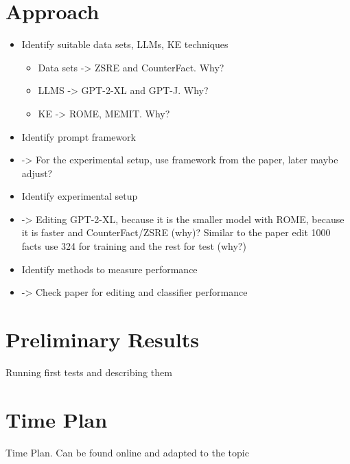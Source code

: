 \documentclass[sigplan, nonacm]{acmart}
\begin{document}
    \section{Approach}
        \begin{itemize}
		\item Identify suitable data sets, LLMs, KE techniques
            \begin{itemize}
    		\item Data sets -> ZSRE and CounterFact. Why?
    		\item LLMS -> GPT-2-XL and GPT-J. Why?
                \item KE -> ROME, MEMIT. Why?
	    \end{itemize}
		\item Identify prompt framework
            \item -> For the experimental setup, use framework from the paper, later maybe adjust?
		\item Identify experimental setup
            \item -> Editing GPT-2-XL, because it is the smaller model with ROME, because it is faster and CounterFact/ZSRE (why)? Similar to the paper edit 1000 facts use 324 for training and the rest for test (why?)
		\item Identify methods to measure performance
            \item -> Check paper for editing and classifier performance
	\end{itemize}

    \section{Preliminary Results}
    	Running first tests and describing them
    
    \section{Time Plan}
    	Time Plan. Can be found online and adapted to the topic
    
\end{document}
